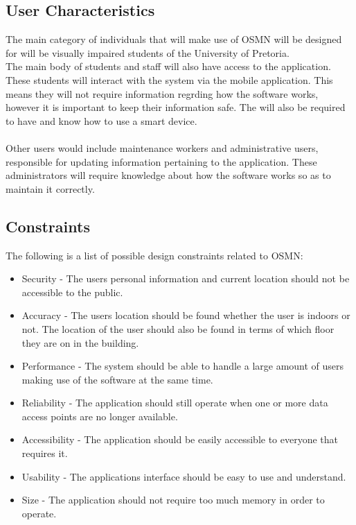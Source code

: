\documentclass{article}
\begin{document}
			
	
	\subsection{User Characteristics}
		The main category of individuals that will make use of OSMN will be designed for will be visually impaired students of the University of Pretoria.\\
		The main body of students and staff will also have access to the application.
		These students will interact with the system via the mobile application. This means they will not require information regrding how the software works, however it is important to keep their information safe. The will also be required to have and know how to use a smart device.\\ \\
		
		Other users would include maintenance workers and administrative users, responsible for updating information pertaining to the application. These administrators will require knowledge about how the software works so as to maintain it correctly.
	
	
	
	\subsection{Constraints}
		The following is a list of possible design constraints related to OSMN:
		
			\begin{itemize}
				\item Security  - The users personal information and current location should not be accessible to the public.
				\item Accuracy - The users location should be found whether the user is indoors or not. The location of the user should also be found in terms of which floor they are on in the building.
				\item Performance - The system should be able to handle a large amount of users making use of the software at the same time.
				\item Reliability - The application should still operate when one or more data access points are no longer available.
				\item Accessibility - The application should be easily accessible to everyone that requires it.
				\item Usability - The applications interface should be easy to use and understand.
				\item Size - The application should not require too much memory in order to operate.
			\end{itemize}
	
\end{document}
